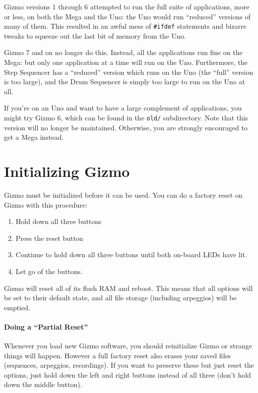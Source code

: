 \documentclass{article}
\begin{document}
Gizmo versions 1 through 6 attempted to run the full suite of applications, more or less, on both the Mega and the Uno: the Uno would run ``reduced'' versions of many of them.  This resulted in an awful mess of {\tt \#ifdef} statements and bizarre tweaks to squeeze out the last bit of memory from the Uno.

Gizmo 7 and on no longer do this.  Instead, all the applications run fine on the Mega: but only one application at a time will run on the Uno.  Furthermore, the Step Sequencer has a ``reduced'' version which runs on the Uno (the ``full'' version is too large), and the Drum Sequencer is simply too large to run on the Uno at all.

If you're on an Uno and want to have a large complement of applications, you might try Gizmo 6, which can be found in the {\tt old/} subdirectory.  Note that this version will no longer be maintained.  Otherwise, you are strongly encouraged to get a Mega instead.

\clearpage
\section{Initializing Gizmo}

Gizmo must be initialized before it can be used.  You can do a factory reset on Gizmo with this procedure:

\begin{enumerate}
\item Hold down all three buttons
\item Press the reset button
\item Continue to hold down all three buttons until both on-board LEDs have lit.
\item Let go of the buttons.
\end{enumerate}

Gizmo will reset all of its flash RAM and reboot.  This means that all options will be set to their default state, and all file storage (including arpeggios) will be emptied.

\paragraph{Doing a ``Partial Reset''} Whenever you load new Gizmo software, you should reinitialize Gizmo or strange things will happen.  However a full factory reset also erases your saved files (sequences, arpeggios, recordings).  If you want to preserve these but just reset the options, just hold down the left and right buttons instead of all three (don't hold down the middle button).
\end{document}
